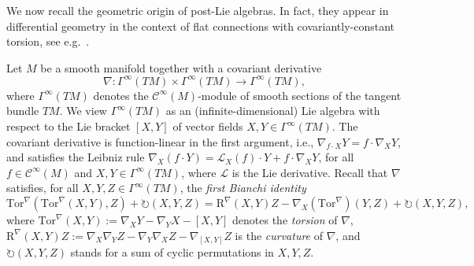 \documentclass[10pt]{article}
\theoremstyle{definition}
\begin{document}
We now recall the geometric origin of post-Lie algebras. In fact, they appear in differential geometry in the context of flat connections with covariantly-constant torsion, see e.g.\ \cite[Sec. 2.1]{ML}.

Let $M$ be a smooth manifold together with a covariant derivative 
$$
\nabla\colon\Gamma^\infty(TM)\times\Gamma^\infty(TM)\to\Gamma^\infty(TM),
$$ 
where $\Gamma^\infty(TM)$ denotes the $\mathscr{C}^\infty(M)$-module of smooth sections of the tangent bundle $TM$. We view $\Gamma^\infty(TM)$ as an (infinite-dimensional) Lie algebra with respect to the Lie bracket $[X,Y]$ of vector fields $X,Y\in\Gamma^\infty(TM)$. The covariant derivative is function-linear in the first argument, i.e., $\nabla_{f\cdot X}Y=f\cdot\nabla_XY$, and satisfies the Leibniz rule $\nabla_X(f\cdot Y)=\mathscr{L}_X(f)\cdot Y + f\cdot\nabla_XY$, for all $f\in\mathscr{C}^\infty(M)$ and $X,Y\in\Gamma^\infty(TM)$, where $\mathcal{L}$ is the Lie derivative. Recall that $\nabla$ satisfies, for all $X,Y,Z\in\Gamma^\infty(TM)$, the \textit{first Bianchi identity}
\begin{equation}\label{eq:Bianchi}
    \mathrm{Tor}^\nabla(\mathrm{Tor}^\nabla(X,Y),Z)+\circlearrowright(X,Y,Z)
    =\mathrm{R}^\nabla(X,Y)Z-\nabla_X(\mathrm{Tor}^\nabla)(Y,Z)+\circlearrowright(X,Y,Z),
\end{equation}
where $\mathrm{Tor}^\nabla(X,Y):=\nabla_XY-\nabla_YX-[X,Y]$ denotes the \textit{torsion} of $\nabla$, $\mathrm{R}^\nabla(X,Y)Z:=\nabla_X\nabla_YZ-\nabla_Y\nabla_XZ-\nabla_{[X,Y]}Z$ is the \textit{curvature} of $\nabla$, and $\circlearrowright(X,Y,Z)$ stands for a sum of cyclic permutations in $X,Y,Z$.
\end{document}
